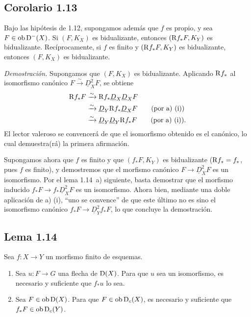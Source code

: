 \subsection*{Corolario 1.13}
Bajo las hipótesis de 1.12, supongamos además que $f$ es propio, y sea $F \in \operatorname{ob} \mathrm{D}^{-}(X)$. Si $(F, K_X)$ es bidualizante, entonces $(\mathrm{R} f_{*}F, K_Y)$ es bidualizante. Recíprocamente, si $f$ es finito y $(\mathrm{R} f_{*}F, K_Y)$ es bidualizante, entonces $(F, K_X)$ es bidualizante.

\emph{Demostración.} Supongamos que $(F, K_X)$ es bidualizante. Aplicando $\mathrm{R} f_{*}$ al isomorfismo canónico $F \xrightarrow{\sim} \underline{D}_X^{2} F$, se obtiene
\begin{align*}
\mathrm{R} f_{*} F &\xrightarrow{\sim} \mathrm{R} f_{*} \underline{D}_X \underline{D}_X F \\
&\xrightarrow{\sim} \underline{D}_Y \mathrm{R} f_{*} \underline{D}_X F \qquad \text{(por a) (i))} \\
&\xrightarrow{\sim} \underline{D}_Y \underline{D}_Y \mathrm{R} f_{*} F \qquad \text{(por a) (i)).}
\end{align*}
El lector valeroso se convencerá de que el isomorfismo obtenido es el canónico, lo cual demuestra(rá) la primera afirmación.

Supongamos ahora que $f$ es finito y que $(f_{*}F, K_Y)$ es bidualizante ($\mathrm{R} f_{*} = f_{*}$, pues $f$ es finito), y demostremos que el morfismo canónico $F \to \underline{D}_X^{2} F$ es un isomorfismo. Por el lema 1.14~a) siguiente, basta demostrar que el morfismo inducido $f_{*}F \to f_{*}\underline{D}_X^{2} F$ es un isomorfismo. Ahora bien, mediante una doble aplicación de a) (i), \textquotedblleft uno se convence\textquotedblright{} de que este último no es sino el isomorfismo canónico $f_{*}F \to \underline{D}_Y^{2} f_{*}F$, lo que concluye la demostración.

\subsection*{Lema 1.14}
Sea $f : X \to Y$ un morfismo finito de esquemas.
\begin{enumerate}
\item[a)] Sea $u : F \to G$ una flecha de $\mathrm{D}(X)$. Para que $u$ sea un isomorfismo, es necesario y suficiente que $f_{*}u$ lo sea.
\item[b)] Sea $F \in \operatorname{ob} \mathrm{D}(X)$. Para que $F \in \operatorname{ob} \mathrm{D}_c(X)$, es necesario y suficiente que $f_{*}F \in \operatorname{ob} \mathrm{D}_c(Y)$.
\end{enumerate}


